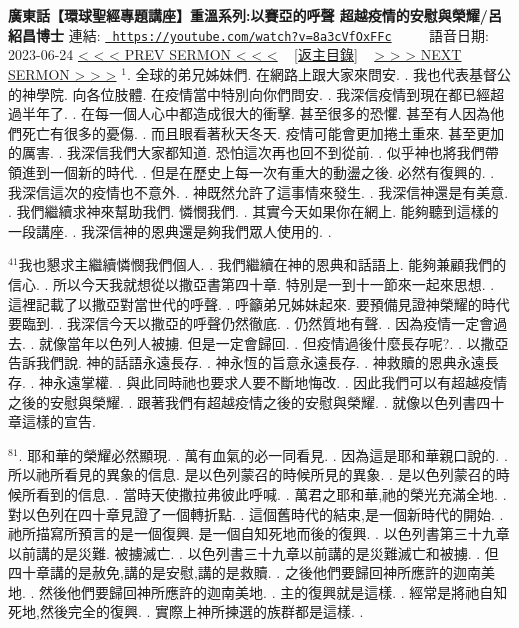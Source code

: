 \documentclass{book}
\begin{document}
\section{}
\label{sec:8a3cVfOxFFc}
\textbf{廣東話【環球聖經專題講座】重溫系列:以賽亞的呼聲 超越疫情的安慰與榮耀/呂紹昌博士}
\newline
\newline
連結: \href{https://youtube.com/watch?v=8a3cVfOxFFc}{\texttt{ https://youtube.com/watch?v=8a3cVfOxFFc}} ~~~~ 語音日期: 2023-06-24 
\newline
\newline
\hyperref[sec:YWND_9pGVGE]{\small{< < < PREV SERMON < < <}}
~
\hyperref[sec:index]{\small{[返主目錄]}}
~
\hyperref[sec:o_naHdmPOsI]{\small{> > > NEXT SERMON > > >}}
\newline
\newline
$^{1}$.
全球的弟兄姊妹們.
在網路上跟大家來問安.
.
我也代表基督公的神學院.
向各位肢體.
在疫情當中特別向你們問安.
.
我深信疫情到現在都已經超過半年了.
.
在每一個人心中都造成很大的衝擊.
甚至很多的恐懼.
甚至有人因為他們死亡有很多的憂傷.
.
而且眼看著秋天冬天.
疫情可能會更加捲土重來.
甚至更加的厲害.
.
我深信我們大家都知道.
恐怕這次再也回不到從前.
.
似乎神也將我們帶領進到一個新的時代.
.
但是在歷史上每一次有重大的動盪之後.
必然有復興的.
.
我深信這次的疫情也不意外.
.
神既然允許了這事情來發生.
.
我深信神還是有美意.
.
我們繼續求神來幫助我們.
憐憫我們.
.
其實今天如果你在網上.
能夠聽到這樣的一段講座.
.
我深信神的恩典還是夠我們眾人使用的.
.

$^{41}$我也懇求主繼續憐憫我們個人.
.
我們繼續在神的恩典和話語上.
能夠兼顧我們的信心.
.
所以今天我就想從以撒亞書第四十章.
特別是一到十一節來一起來思想.
.
這裡記載了以撒亞對當世代的呼聲.
.
呼籲弟兄姊妹起來.
要預備見證神榮耀的時代要臨到.
.
我深信今天以撒亞的呼聲仍然徹底.
.
仍然質地有聲.
.
因為疫情一定會過去.
.
就像當年以色列人被擄.
但是一定會歸回.
.
但疫情過後什麼長存呢?.
.
以撒亞告訴我們說.
神的話語永遠長存.
.
神永恆的旨意永遠長存.
.
神救贖的恩典永遠長存.
.
神永遠掌權.
.
與此同時祂也要求人要不斷地悔改.
.
因此我們可以有超越疫情之後的安慰與榮耀.
.
跟著我們有超越疫情之後的安慰與榮耀.
.
就像以色列書四十章這樣的宣告.

$^{81}$.
耶和華的榮耀必然顯現.
.
萬有血氣的必一同看見.
.
因為這是耶和華親口說的.
.
所以祂所看見的異象的信息.
是以色列蒙召的時候所見的異象.
.
是以色列蒙召的時候所看到的信息.
.
當時天使撒拉弗彼此呼喊.
.
萬君之耶和華,祂的榮光充滿全地.
.
對以色列在四十章見證了一個轉折點.
.
這個舊時代的結束,是一個新時代的開始.
.
祂所描寫所預言的是一個復興.
是一個自知死地而後的復興.
.
以色列書第三十九章以前講的是災難.
被擄滅亡.
.
以色列書三十九章以前講的是災難滅亡和被擄.
.
但四十章講的是赦免,講的是安慰,講的是救贖.
.
之後他們要歸回神所應許的迦南美地.
.
然後他們要歸回神所應許的迦南美地.
.
主的復興就是這樣.
.
經常是將祂自知死地,然後完全的復興.
.
實際上神所揀選的族群都是這樣.
.
\end{document}
